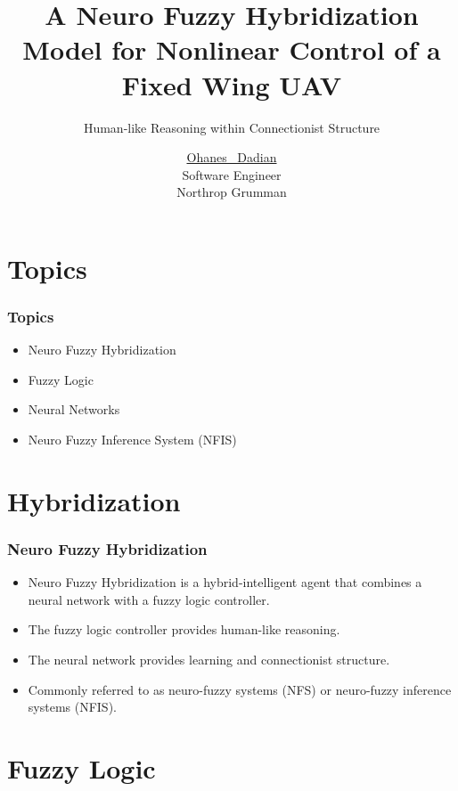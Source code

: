 \documentclass{beamer}
\title[Neuro Fuzzy Hybridization]
   {A Neuro Fuzzy Hybridization Model for Nonlinear Control of a Fixed Wing UAV}
\subtitle{Human-like Reasoning within Connectionist Structure}
\author[Dadian]
   {\underline{Ohanes ~Dadian\inst{1}}\\
   Software Engineer\\
   Northrop Grumman}
\begin{document}
   \frame{\titlepage}

   \section{Topics}
   
   \begin{frame}
      \frametitle{Topics}
      \begin{itemize}
         \item Neuro Fuzzy Hybridization
         \item Fuzzy Logic
         \item Neural Networks
         \item Neuro Fuzzy Inference System (NFIS)
      \end{itemize}
   \end{frame}
   
   \section{Hybridization}

   \begin{frame}
      \frametitle{Neuro Fuzzy Hybridization}
      \begin{itemize}
         \item Neuro Fuzzy Hybridization is a hybrid-intelligent agent that combines a neural network with a fuzzy logic controller.
         \item The fuzzy logic controller provides human-like reasoning.
         \item The neural network provides learning and connectionist structure.
         \item Commonly referred to as neuro-fuzzy systems (NFS) or neuro-fuzzy inference systems (NFIS).
      \end{itemize}
   \end{frame}

   \section{Fuzzy Logic}
\end{document}
